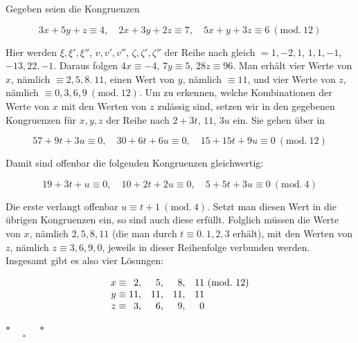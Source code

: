 Gegeben seien die Kongruenzen

\[3x+5y+z\equiv4,\quad2x+3y+2z\equiv7,\quad5x+y+3z\equiv6\ (\mathrm{mod.}\ 12)\]

Hier werden $\xi,\xi',\xi''$, $v,v',v''$, $\zeta,\zeta',\zeta''$ der Reihe nach gleich $=1,-2,1$, $1,1,-1$, $-13,22,-1$. Daraus folgen $4x\equiv-4$, $7y\equiv5$, $28z\equiv96$. Man erhält vier Werte von $x$, nämlich $\equiv2,5,8.\ 11$, einen Wert von $y$, nämlich $\equiv11$, und vier Werte von $z$, nämlich $\equiv0,3,6,9\ (\mathrm{mod.}\ 12)$. Um zu erkennen, welche Kombinationen der Werte von $x$ mit den Werten von $z$ zulässig sind, setzen wir in den gegebenen Kongruenzen für $x,y,z$ der Reihe nach $2+3t$, $11$, $3u$ ein. Sie gehen über in

\[57+9t+3u\equiv0,\quad30+6t+6u\equiv0,\quad15+15t+9u\equiv0\ (\mathrm{mod.}\ 12)\]

Damit sind offenbar die folgenden Kongruenzen gleichwertig:

\[19+3t+u\equiv0,\quad10+2t+2u\equiv0,\quad5+5t+3u\equiv0\ (\mathrm{mod.}\ 4)\]

Die erste verlangt offenbar $u\equiv t+1\ (\mathrm{mod.}\ 4)$. Setzt man diesen Wert in die übrigen Kongruenzen ein, so sind auch diese erfüllt. Folglich müssen die Werte von $x$, nämlich $2,5,8,11$ (die man durch $t\equiv0.\ 1,2,3$ erhält), mit den Werten von $z$, nämlich $z\equiv3,6,9,0$, jeweils in dieser Reihenfolge verbunden werden. Insgesamt gibt es also vier Lösungen:

\[\begin{array}{r@{\;}r@{,\quad}r@{,\quad}r@{,\quad}r@{\ }l}
x\equiv&2&5&8&11&(\mathrm{mod.}\ 12)\\
y\equiv&11&11&11&11&\\
z\equiv&3&6&9&0&
\end{array}\]

\begin{center}$\ast\quad\underset{\ast}{\phantom{\ast}}\quad\ast$\end{center}

